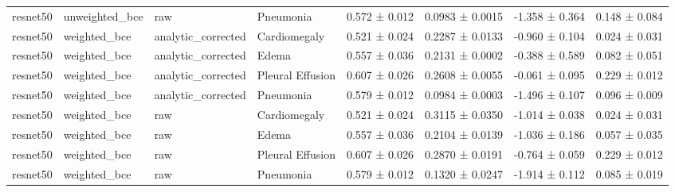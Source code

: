 \begin{tabular}{llllllll}
resnet50 & unweighted_bce & raw & Pneumonia & 0.572 ± 0.012 & 0.0983 ± 0.0015 & -1.358 ± 0.364 & 0.148 ± 0.084 \\
resnet50 & weighted_bce & analytic_corrected & Cardiomegaly & 0.521 ± 0.024 & 0.2287 ± 0.0133 & -0.960 ± 0.104 & 0.024 ± 0.031 \\
resnet50 & weighted_bce & analytic_corrected & Edema & 0.557 ± 0.036 & 0.2131 ± 0.0002 & -0.388 ± 0.589 & 0.082 ± 0.051 \\
resnet50 & weighted_bce & analytic_corrected & Pleural Effusion & 0.607 ± 0.026 & 0.2608 ± 0.0055 & -0.061 ± 0.095 & 0.229 ± 0.012 \\
resnet50 & weighted_bce & analytic_corrected & Pneumonia & 0.579 ± 0.012 & 0.0984 ± 0.0003 & -1.496 ± 0.107 & 0.096 ± 0.009 \\
resnet50 & weighted_bce & raw & Cardiomegaly & 0.521 ± 0.024 & 0.3115 ± 0.0350 & -1.014 ± 0.038 & 0.024 ± 0.031 \\
resnet50 & weighted_bce & raw & Edema & 0.557 ± 0.036 & 0.2104 ± 0.0139 & -1.036 ± 0.186 & 0.057 ± 0.035 \\
resnet50 & weighted_bce & raw & Pleural Effusion & 0.607 ± 0.026 & 0.2870 ± 0.0191 & -0.764 ± 0.059 & 0.229 ± 0.012 \\
resnet50 & weighted_bce & raw & Pneumonia & 0.579 ± 0.012 & 0.1320 ± 0.0247 & -1.914 ± 0.112 & 0.085 ± 0.019 \\
\bottomrule
\end{tabular}
